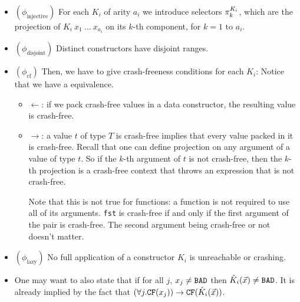 \documentclass[preprint]{sigplanconf}
\begin{document}
\begin{itemize}
\item $(\phi_\text{injective})$ For each $K_i$ of arity $a_i$ we introduce selectors
  $\pi_{k}^{K_i}$, which are the projection of $K_i~x_1~\dots~x_{a_i}$
  on its $k$-th component, for $k = 1\text{ to }a_i$.
\item $(\phi_\text{disjoint})$ Distinct constructors have disjoint ranges.
\item $(\phi_\text{cf})$ Then, we have to give crash-freeness conditions for each $K_i$:
  Notice that we have a equivalence.
  \begin{itemize}
  \item $\gets$: if we pack crash-free values in a data constructor,
    the resulting value is crash-free. 
  \item $\to$: a value $t$ of type $T$ is crash-free implies
    that every value packed in it is crash-free. Recall that one can
    define projection on any argument of a value of type $t$. So if
    the $k$-th argument of $t$ is not crash-free, then the $k$-th
    projection is a crash-free context that throws an expression that
    is not crash-free. 

  Note that this is not true for functions: a function is not required
  to use all of its arguments. \texttt{fst} is crash-free if and only
  if the first argument of the pair is crash-free. The second argument
  being crash-free or not doesn't matter.

  \end{itemize}

\item $(\phi_\text{lazy})$ No full application of a constructor $K_i$ is unreachable or crashing.
\item One may want to also state that if for all $j$, $x_j \neq \texttt{BAD}$ then
  $\hat{K}_i(\vec{x}) \neq \texttt{BAD}$. It is already implied by the fact that
  $\left(\forall j. \texttt{CF}(x_j)\right) \to \texttt{CF}(\hat{K}_i(\vec{x}))$.
\end{itemize}
\end{document}
